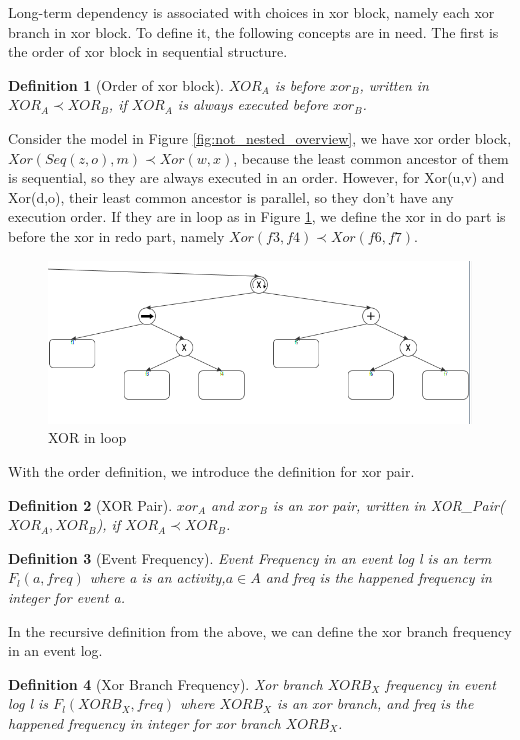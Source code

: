 \documentclass[]{article}
\newtheorem{mydef}{Definition}[section]
\begin{document}
Long-term dependency is associated with choices in xor block, namely each xor branch in xor block. To define it, the following concepts are in need. The first is the order of xor block in sequential structure.
\begin{mydef}[Order of xor block]
	$XOR_A$ is before $xor_B$, written in $XOR_A \prec XOR_B$, if $XOR_A$ is always executed before $xor_B$.  %
\end{mydef}
Consider the model in Figure \ref{fig:not_nested_overview}, we have xor order block, $Xor(Seq(z,o),m) \prec Xor(w,x)$, because the least common ancestor of them is sequential, so they are always executed in an order. However, for Xor(u,v) and Xor(d,o), their least common ancestor is parallel, so they don't have any execution order. If they are in loop as in Figure \ref{fig:xor_in_loop}, we define the xor in do part is before the xor in redo part, namely $Xor(f3,f4) \prec Xor(f6,f7)$.
\begin{figure}[h!]
	\includegraphics[width=\textwidth]{PT03_xor_in_loop.png}
	\caption{XOR in loop}
	\label{fig:xor_in_loop}
\end{figure}
With the order definition, we introduce the definition for xor pair.
\begin{mydef}[XOR Pair]
	$xor_A$ and $xor_B$ is an xor pair, written in XOR\_Pair($XOR_A, XOR_B$), if $XOR_A \prec XOR_B$.
\end{mydef}
\begin{mydef}[Event Frequency]
	Event Frequency in an event log l is an term $F_{l}(a,freq)$ where a is an activity,$a \in A$  and freq is the happened frequency in integer for event a.
\end{mydef}
In the recursive definition from the above, we can define the xor branch frequency in an event log.
\begin{mydef}[Xor Branch Frequency]
	Xor branch $XORB_X$ frequency in event log l is $F_{l}(XORB_X,freq)$ where $XORB_X$ is an xor branch, and freq is the happened frequency in integer for xor branch $XORB_X$.
\end{mydef}
\end{document}
